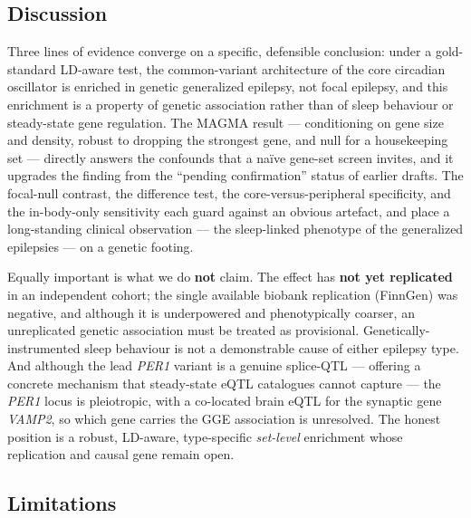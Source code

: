 \documentclass[
]{article}
\begin{document}
\subsection{Discussion}\label{discussion}

Three lines of evidence converge on a specific, defensible conclusion:
under a gold-standard LD-aware test, the common-variant architecture of
the core circadian oscillator is enriched in genetic generalized
epilepsy, not focal epilepsy, and this enrichment is a property of
genetic association rather than of sleep behaviour or steady-state gene
regulation. The MAGMA result --- conditioning on gene size and density,
robust to dropping the strongest gene, and null for a housekeeping set
--- directly answers the confounds that a naïve gene-set screen invites,
and it upgrades the finding from the ``pending confirmation'' status of
earlier drafts. The focal-null contrast, the difference test, the
core-versus-peripheral specificity, and the in-body-only sensitivity
each guard against an obvious artefact, and place a long-standing
clinical observation --- the sleep-linked phenotype of the generalized
epilepsies --- on a genetic footing.

Equally important is what we do \textbf{not} claim. The effect has
\textbf{not yet replicated} in an independent cohort; the single
available biobank replication (FinnGen) was negative, and although it is
underpowered and phenotypically coarser, an unreplicated genetic
association must be treated as provisional. Genetically-instrumented
sleep behaviour is not a demonstrable cause of either epilepsy type. And
although the lead \emph{PER1} variant is a genuine splice-QTL ---
offering a concrete mechanism that steady-state eQTL catalogues cannot
capture --- the \emph{PER1} locus is pleiotropic, with a co-located
brain eQTL for the synaptic gene \emph{VAMP2}, so which gene carries the
GGE association is unresolved. The honest position is a robust,
LD-aware, type-specific \emph{set-level} enrichment whose replication
and causal gene remain open.

\subsection{Limitations}\label{limitations}
\end{document}
